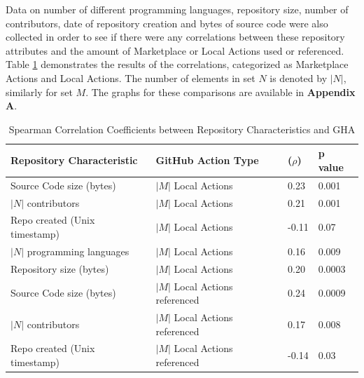 \documentclass[conference]{IEEEtran}
\begin{document}
	Data on number of different programming languages, repository size, number of contributors, date of repository creation and bytes of source code were also collected in order to see if there were any correlations between these repository attributes and the amount of Marketplace or Local Actions used or referenced. Table \ref{tab:correlation_results} demonstrates the results of the correlations, categorized as Marketplace Actions and Local Actions. The number of elements in set $N$ is denoted by $|N|$, similarly for set $M$. The graphs for these comparisons are available in \textbf{Appendix A}.\\
      \begin{table}[H]
          \centering
          \caption{Spearman Correlation Coefficients between Repository Characteristics and GHA}
          \label{tab:correlation_results}
          \setlength{\oddsidemargin}{-2in} %
          \begin{tabular}{|p{2.5cm}|p{3cm}|p{0.75cm}|p{1cm}|}
            \hline
            \textbf{Repository \newline Characteristic} & \textbf{GitHub Action Type} & \textbf{(\(\rho\))} & \textbf{p value} \\
            \hline
            Source Code size \newline (bytes) & $|M|$ Local Actions & 0.23 & 0.001 \\
            \hline
            $|N|$ contributors & $|M|$ Local Actions & 0.21 & 0.001 \\
            \hline
            Repo created \newline (Unix timestamp) & $|M|$ Local Actions & -0.11 & 0.07 \\
            \hline
            $|N|$ programming \newline languages & $|M|$ Local Actions & 0.16 & 0.009 \\
            \hline
            Repository size \newline (bytes) & $|M|$ Local Actions & 0.20 & 0.0003 \\
            \hline
            Source Code size \newline (bytes) & $|M|$ Local Actions \newline referenced & 0.24 & 0.0009 \\
            \hline
            $|N|$ contributors & $|M|$ Local Actions \newline referenced & 0.17 & 0.008 \\
            \hline
            Repo created \newline (Unix timestamp) & $|M|$ Local Actions \newline referenced & -0.14 & 0.03 \\

\end{tabular}
\end{table}
\end{document}
